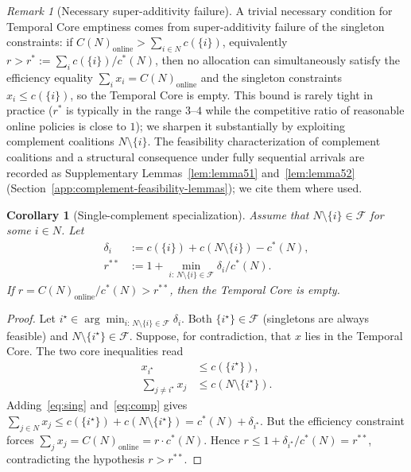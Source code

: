 \documentclass[11pt]{article}
\theoremstyle{plain}
\newtheorem{corollary}[theorem]{Corollary}
\theoremstyle{definition}
\theoremstyle{remark}
\newtheorem{remark}[theorem]{Remark}
\newcommand{\F}{\mathcal{F}}
\newcommand{\cstar}{c^{\ast}}
\begin{document}
\begin{remark}[Necessary super-additivity failure]
\label{rem:remark1}
\label{rem:rstar}
A trivial necessary condition for Temporal Core emptiness comes from super-additivity failure of the singleton constraints: if $C(N)_{\text{online}} > \sum_{i\in N} c(\{i\})$, equivalently $r > r^{\ast} := \sum_i c(\{i\})/\cstar(N)$, then no allocation can simultaneously satisfy the efficiency equality $\sum_i x_i = C(N)_{\text{online}}$ and the singleton constraints $x_i \le c(\{i\})$, so the Temporal Core is empty. This bound is rarely tight in practice ($r^{\ast}$ is typically in the range $3$--$4$ while the competitive ratio of reasonable online policies is close to $1$); we sharpen it substantially by exploiting complement coalitions $N\setminus\{i\}$. The feasibility characterization of complement coalitions and a structural consequence under fully sequential arrivals are recorded as Supplementary Lemmas~\ref{lem:lemma51} and~\ref{lem:lemma52} (Section~\ref{app:complement-feasibility-lemmas}); we cite them where used.
\end{remark}

\addtocounter{theorem}{3}
\begin{corollary}[Single-complement specialization]
\label{cor:single-complement}
Assume that $N\setminus\{i\}\in\F$ for some $i\in N$. Let
\[
\begin{aligned}
\delta_i & := c(\{i\}) + c(N\setminus\{i\}) - \cstar(N), \\
r^{\ast\ast} & := 1 + \min_{i:\,N\setminus\{i\}\in\F} \delta_i/\cstar(N).
\end{aligned}
\]
If $r = C(N)_{\text{online}}/\cstar(N) > r^{\ast\ast}$, then the Temporal Core is empty.
\end{corollary}

\begin{proof}
Let $i^{\star}\in\arg\min_{i:\,N\setminus\{i\}\in\F} \delta_i$. Both $\{i^{\star}\}\in\F$ (singletons are always feasible) and $N\setminus\{i^{\star}\}\in\F$. Suppose, for contradiction, that $x$ lies in the Temporal Core. The two core inequalities read
\begin{align}
x_{i^{\star}} &\le c(\{i^{\star}\}), \label{eq:sing}\\
\sum_{j\neq i^{\star}} x_j &\le c(N\setminus\{i^{\star}\}).\label{eq:comp}
\end{align}
Adding~\eqref{eq:sing} and~\eqref{eq:comp} gives $\sum_{j\in N} x_j \le c(\{i^{\star}\}) + c(N\setminus\{i^{\star}\}) = \cstar(N) + \delta_{i^{\star}}$. But the efficiency constraint forces $\sum_j x_j = C(N)_{\text{online}} = r\cdot \cstar(N)$. Hence $r\le 1 + \delta_{i^{\star}}/\cstar(N) = r^{\ast\ast}$, contradicting the hypothesis $r>r^{\ast\ast}$.
\end{proof}
\end{document}
